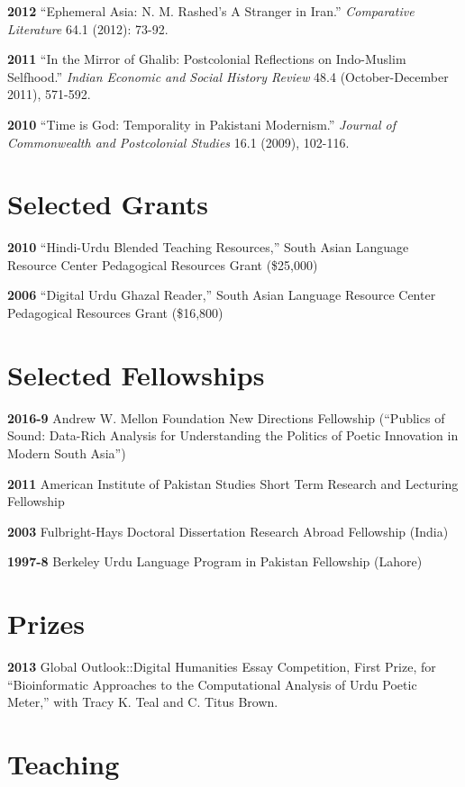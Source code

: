\documentclass[letterpaper,12pt]{article}
\begin{document}
\textbf{2012}
“Ephemeral Asia: N. M. Rashed’s A Stranger in Iran.”
\emph{Comparative Literature} 64.1 (2012): 73-92.

\textbf{2011}
“In the Mirror of Ghalib: Postcolonial Reflections on Indo-Muslim Selfhood.”
\emph{Indian Economic and Social History Review} 48.4 (October-December 2011), 571-592.

\textbf{2010}
“Time is God: Temporality in Pakistani Modernism.”
\emph{Journal of Commonwealth and Postcolonial Studies} 16.1 (2009), 102-116.


\section{Selected Grants%
  \label{selected-grants}%
}

\textbf{2010}
“Hindi-Urdu Blended Teaching Resources,”
South Asian Language Resource Center Pedagogical Resources Grant (\$25,000)

\textbf{2006}
“Digital Urdu Ghazal Reader,”
South Asian Language Resource Center Pedagogical Resources Grant (\$16,800)


\section{Selected Fellowships%
  \label{selected-fellowships}%
}

\textbf{2016-9}
Andrew W. Mellon Foundation
New Directions Fellowship (“Publics of Sound: Data-Rich Analysis for Understanding the Politics of Poetic Innovation in Modern South Asia”)

\textbf{2011}
American Institute of Pakistan Studies
Short Term Research and Lecturing Fellowship

\textbf{2003}
Fulbright-Hays Doctoral Dissertation Research Abroad Fellowship (India)

\textbf{1997-8}
Berkeley Urdu Language Program in Pakistan Fellowship (Lahore)


\section{Prizes%
  \label{prizes}%
}

\textbf{2013}
Global Outlook::Digital Humanities Essay Competition,
First Prize,
for “Bioinformatic Approaches to the Computational Analysis of Urdu Poetic Meter,”
with Tracy K. Teal and C. Titus Brown.


\section{Teaching%
  \label{teaching}%
}
\end{document}
